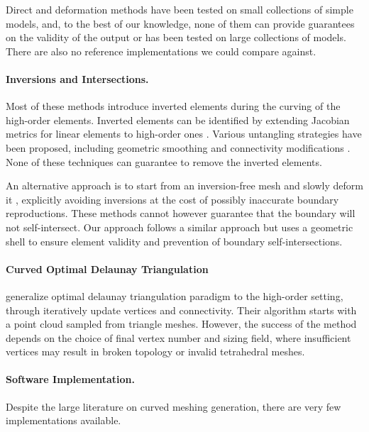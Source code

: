 Direct and deformation methods have been tested on small collections of simple models, and, to the best of our knowledge, none of them can provide guarantees on the validity of the output or has been tested on large collections of models. There are also no  reference implementations we could compare against. 

\paragraph{Inversions and Intersections.} Most of these methods introduce inverted elements during the curving of the high-order elements. Inverted elements can be identified by extending Jacobian metrics for linear elements \cite{Knupp20002,Knupp2000} to high-order ones \cite{Luke2018,Gargallo2014,johnen2013geometrical,Poya2016,Roca2012}. Various untangling strategies have been proposed, including geometric smoothing and connectivity modifications  \cite{Cardoze2004,dey1999curvilinear,gargallo2013high,George2012,Qiukai2013,Luo2002pVersionMG,Peir2008,SHEPHARD2005251,dobrzynski2017,Gargallo2015,Geuzaine2015,Roca2012,RUIZGIRONES2017362,RUIZGIRONES201652,RUIZGIRONES2016315,STEES2017180,Steve2016,TOULORGE20138,TOULORGE2016361,ZIEL201791,dobrev2019target, turner2017high, luo2008tracking,lu2014parallel}.  None of these techniques can guarantee to remove the inverted elements.

An alternative approach is to start from an inversion-free mesh and slowly deform it \cite{Persson2009,RUIZGIRONES2017362}, explicitly avoiding inversions at the cost of possibly inaccurate boundary reproductions. These methods cannot however guarantee that the boundary will not self-intersect. Our approach follows a similar approach but uses a geometric shell to ensure element validity and prevention of boundary self-intersections.

\paragraph{Curved Optimal Delaunay Triangulation}
\cite{feng2018curved} generalize optimal delaunay triangulation paradigm to the high-order setting, through iteratively update vertices and connectivity.
Their algorithm starts with a point cloud sampled from triangle meshes. However, the success of the method depends on the choice of final vertex number and sizing field, where insufficient vertices may result in broken topology or invalid tetrahedral meshes.

\paragraph{Software Implementation.}
Despite the large literature on curve{d} meshing generation, there are very few implementations available. 

